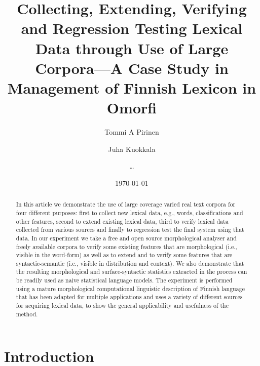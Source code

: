 \documentclass[a5paper]{article}
\title{Collecting, Extending, Verifying and Regression Testing Lexical Data through
Use of Large Corpora---A Case Study in Management of Finnish Lexicon in Omorfi}
\author{Tommi A Pirinen \and Juha Kuokkala \and \ldots}
\date{\today}
\begin{document}
\maketitle

\begin{abstract} 
    
    In this article we demonstrate the use of large coverage varied real text
    corpora for four different purposes: first to collect new lexical data,
    e.g., words, classifications and other features, second to extend existing
    lexical data, third to verify lexical data collected from various sources
    and finally to regression test the final system using that data.  In our
    experiment we take a free and open source morphological analyser and freely
    available corpora to verify some existing features that are morphological
    (i.e., visible in the word-form) as well as to extend and to verify some
    features that are syntactic-semantic (i.e., visible in distribution and
    context). We also demonstrate that the resulting morphological and
    surface-syntactic statistics extracted in the process can be readily used
    as naive statistical language models. The experiment is performed using a
    mature morphological computational linguistic description of Finnish
    language that has been adapted for multiple applications and uses a variety
    of different sources for acquiring lexical data, to show the general
    applicability and usefulness of the method.

\end{abstract}

\section{Introduction}
\label{sec:introduction}
\end{document}
